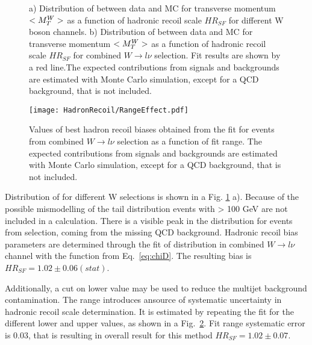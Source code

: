 \begin{figure}[!tbp]
\begin{minipage}[h]{0.49\linewidth}
\end{minipage}
\hfill
\begin{minipage}[h]{0.49\linewidth}
\end{minipage}
\caption{a) Distribution of \chiD  between data and MC for transverse momentum $<M_T^W>$ as a function of hadronic recoil scale $HR_{SF}$ for different W boson channels. 
b) Distribution of \chiD  between data and MC for transverse momentum $<M_T^W>$ as a function of hadronic recoil scale $HR_{SF}$ for combined $W \to l \nu$ selection. Fit results are shown by a red line.The expected contributions from signals and backgrounds are estimated with Monte Carlo simulation, except for a QCD background, that is not included.}
\label{mtWChi2}
\end{figure}

\begin{figure}[!tbp]
\centering
\texttt{[image: HadronRecoil/RangeEffect.pdf]}
\caption{Values of best hadron recoil biases obtained from the fit for events from combined $W \to l \nu$ selection as a function of fit range. The expected contributions from signals and backgrounds are estimated with Monte Carlo simulation, except for a QCD background, that is not included.}
\label{ScaleMtWRange}
\end{figure}

Distribution of \chiD for different W selections is shown in a Fig. \ref{mtWChi2} a). Because of the possible mismodelling of the tail \mtw distribution events with \mtw > 100 GeV are not included in a \chiD calculation. There is a visible peak in the \chiD distribution for events from \wenu selection, coming from the missing QCD background. Hadronic recoil bias parameters are determined through the fit of \chiD distribution in combined $W\to l\nu$ channel with the function from Eq.~\ref{eq:chiD}. The resulting bias is $HR_{SF}=1.02\pm0.06 (stat)$. 

Additionally, a cut on \mtw lower value may be used to reduce the multijet background contamination. The \mtw range introduces ansource of systematic uncertainty in hadronic recoil scale determination. It is estimated by repeating the fit for the different \mtw lower and upper values, as shown in a Fig.~\ref{ScaleMtWRange}. Fit range systematic error is 0.03, that is resulting in overall result for this method $HR_{SF}=1.02\pm0.07$. 


